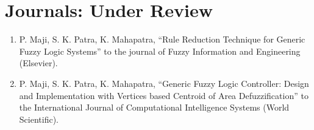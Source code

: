 \section*{Journals: Under Review}
\begin{enumerate}
	\item P. Maji, S. K. Patra, K. Mahapatra, ``Rule Reduction Technique for Generic Fuzzy Logic Systems'' to the journal of Fuzzy Information and Engineering (Elsevier). 
	\item P. Maji, S. K. Patra, K. Mahapatra, ``Generic Fuzzy Logic Controller: Design and Implementation with Vertices based Centroid of Area Defuzzification'' to the International Journal of Computational Intelligence Systems (World Scientific).
\end{enumerate}
